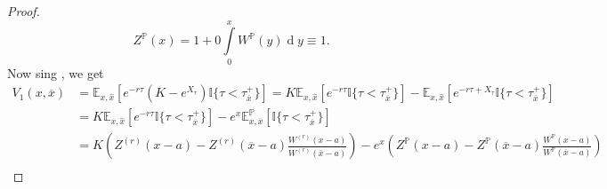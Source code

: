 \documentclass[10pt,a4paper]{amsart}
\def\E{{\mathbb{E}}}
\def\Eq{{\mathbb{E}
		_{x,\hat{x}}}}
\def\P{{\mathbb{P}}}
\def \R{{{\rm I{\!}\rm R}}}
\def \I{{\mathbb{I}}}
\newcommand{\dx}{\operatorname{d}\!}
\def\P{{\mathbb P}} \def\le{\left} \def\ri{\right} \def\i{\infty}
\def\E{{\mathbb E}} \def\PP{\mc P} \def\Z{{\mathbb Z}} \def\R{{\mathbb R}}
\begin{document}
\begin{proof}
			\begin{equation}\label{Z_P}
				Z^{\mathbb{P}}(x) = 1 + 0\int\limits_{0}^{x} W^{\mathbb{P}}(y)\dx y \equiv 1.
			\end{equation}
			Now sing \cite[eq. (2.4)]{MP}, we get
			\begin{align}
				\nonumber	V_1(x, \overline{x}) &= \Eq\left[ e^{-r\tau} \left( K - e^{X_\tau} \right) \I
				\{ \tau < \tau_{\overline{x}}^+ \} \right]  = K\Eq \left[ e^{-r\tau} \I
				\{ \tau < \tau_{\overline{x}}^+ \} \right] - \Eq\left[ e^{-r\tau + X_\tau} \I
				\{ \tau < \tau_{\overline{x}}^+ \} \right] \\
				\nonumber & =  K\Eq \left[ e^{-r\tau} \I
				\{ \tau < \tau_{\overline{x}}^+ \} \right] - e^x \E^\P_{x, \overline{x}}\left[ \I
				\{ \tau < \tau_{\overline{x}}^+ \} \right] \\
				\nonumber & =  K\left( Z^{(r)}(x-a) - Z^{(r)}(\overline{x}-a)\frac{W^{(r)}(x-a)}{W^{(r)}(\overline{x}-a)} \right) -e^x\left( Z^{\P}(x-a) - Z^{\P}(\overline{x}-a)\frac{W^{\P}(x-a)}{W^{\P}(\overline{x}-a)} \right) \\

\end{align}
\end{proof}
\end{document}
